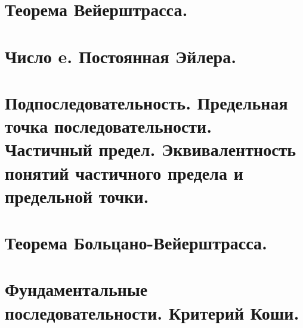 \documentclass[a4paper,12pt]{article}
\begin{document}
    \subsection{}
    \subsection{}
    \subsection{}

    \newpage
    \section{Теорема Вейерштрасса.}

    \newpage
    \section{Число e. Постоянная Эйлера.}

    \newpage
    \section{Подпоследовательность. Предельная точка последовательности. Частичный предел. Эквивалентность понятий частичного предела и предельной точки.}
    \subsection{}
    \subsection{}
    \subsection{}
    \subsection{}

    \newpage
    \section{Теорема Больцано-Вейерштрасса.}

    \newpage
    \section{Фундаментальные последовательности. Критерий Коши.}
\end{document}
